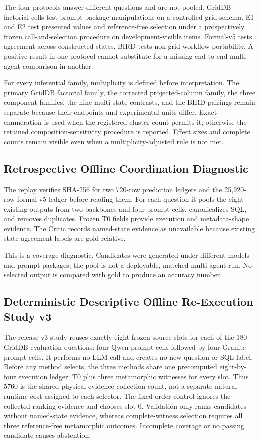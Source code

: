 \documentclass[applsci,article,submit,moreauthors]{Definitions/mdpi}
\begin{document}
The four protocols answer different questions and are not pooled. GridDB factorial cells test prompt-package manipulations on a controlled grid schema. E1 and E2 test presented values and reference-free selection under a prospectively frozen call-and-selection procedure on development-visible items. Formal-v5 tests agreement across constructed states. BIRD tests non-grid workflow portability. A positive result in one protocol cannot substitute for a missing end-to-end multi-agent comparison in another.

For every inferential family, multiplicity is defined before interpretation. The primary GridDB factorial family, the corrected projected-column family, the three component families, the nine multi-state contrasts, and the BIRD pairings remain separate because their endpoints and experimental units differ. Exact enumeration is used when the registered cluster count permits it; otherwise the retained composition-sensitivity procedure is reported. Effect sizes and complete counts remain visible even when a multiplicity-adjusted rule is not met.

\subsection{Retrospective Offline Coordination Diagnostic}

The replay verifies SHA-256 for two 720-row prediction ledgers and the 25,920-row formal-v5 ledger before reading them. For each question it pools the eight existing outputs from two backbones and four prompt cells, canonicalizes SQL, and removes duplicates. Frozen T0 fields provide execution and metadata-shape evidence. The Critic records named-state evidence as unavailable because existing state-agreement labels are gold-relative.

This is a coverage diagnostic. Candidates were generated under different models and prompt packages; the pool is not a deployable, matched multi-agent run. No selected output is compared with gold to produce an accuracy number.

\subsection{Deterministic Descriptive Offline Re-Execution Study v3}

The release-v3 study reuses exactly eight frozen source slots for each of the 180 GridDB evaluation questions: four Qwen prompt cells followed by four Granite prompt cells. It performs no LLM call and creates no new question or SQL label. Before any method selects, the three methods share one precomputed eight-by-four execution ledger: T0 plus three metamorphic witnesses for every slot. Thus 5760 is the shared physical evidence-collection count, not a separate natural runtime cost assigned to each selector. The fixed-order control ignores the collected ranking evidence and chooses slot 0. Validation-only ranks candidates without named-state evidence, whereas complete-witness selection requires all three reference-free metamorphic outcomes. Incomplete coverage or no passing candidate causes abstention.
\end{document}
